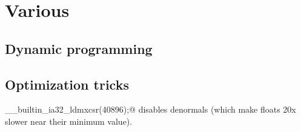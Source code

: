 \chapter{Various}



\section{Dynamic programming}


\section{Optimization tricks}
	\verb@__builtin_ia32_ldmxcsr(40896);@ disables denormals (which make floats 20x slower near their minimum value).
